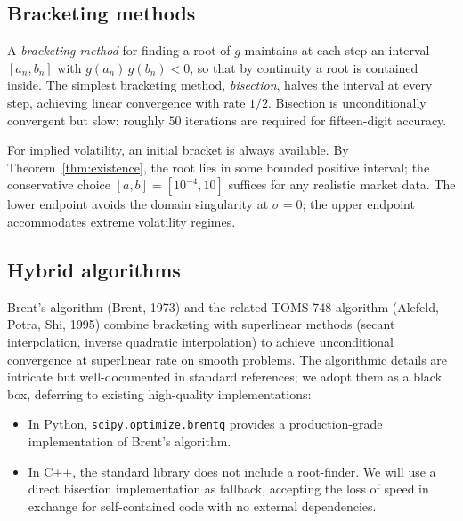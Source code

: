 \documentclass[11pt,a4paper]{article}
\theoremstyle{plain}
\theoremstyle{definition}
\theoremstyle{remark}
\begin{document}
\subsection{Bracketing methods}

A \emph{bracketing method} for finding a root of \(g\) maintains at
each step an interval \([a_n, b_n]\) with \(g(a_n)\,g(b_n) < 0\), so
that by continuity a root is contained inside. The simplest
bracketing method, \emph{bisection}, halves the interval at every
step, achieving linear convergence with rate \(1/2\). Bisection is
unconditionally convergent but slow: roughly \(50\) iterations are
required for fifteen-digit accuracy.

For implied volatility, an initial bracket is always available. By
Theorem~\ref{thm:existence}, the root lies in some bounded
positive interval; the conservative choice \([a, b] = [10^{-4}, 10]\)
suffices for any realistic market data. The lower endpoint avoids the
domain singularity at \(\sigma = 0\); the upper endpoint accommodates
extreme volatility regimes.

\subsection{Hybrid algorithms}

Brent's algorithm (Brent, 1973) and the related TOMS-748 algorithm
(Alefeld, Potra, Shi, 1995) combine bracketing with superlinear
methods (secant interpolation, inverse quadratic interpolation) to
achieve unconditional convergence at superlinear rate on smooth
problems. The algorithmic details are intricate but well-documented
in standard references; we adopt them as a black box, deferring to
existing high-quality implementations:

\begin{itemize}
    \item In Python, \texttt{scipy.optimize.brentq} provides a
    production-grade implementation of Brent's algorithm.
    \item In C++, the standard library does not include a
    root-finder. We will use a direct bisection implementation as
    fallback, accepting the loss of speed in exchange for
    self-contained code with no external dependencies.
\end{itemize}
\end{document}
